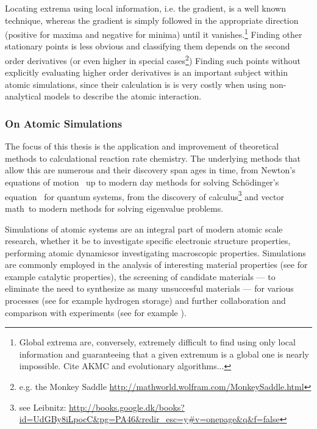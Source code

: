Locating extrema using local information, i.e. the gradient, is a well known technique\citemiss, whereas the gradient is simply followed in the appropriate direction (positive for maxima and negative for minima) until it vanishes.\footnote{Global extrema are, conversely, extremely difficult to find using only local information and guaranteeing that a given extremum is a global one is nearly impossible. Cite AKMC and evolutionary algorithms...}
Finding other stationary points is less obvious and classifying them depends on the second order derivatives (or even higher in special cases\footnote{e.g. the Monkey Saddle \url{http://mathworld.wolfram.com/MonkeySaddle.html}})
Finding such points without explicitly evaluating higher order derivatives is an important subject within atomic simulations, since their calculation is is very costly when using non-analytical  models to describe the atomic interaction.

\subsubsection{On Atomic Simulations}
The focus of this thesis is the application and improvement of theoretical methods to calculational reaction rate chemistry.
The underlying methods that allow this are numerous and their discovery span ages in time, from Newton's equations of motion~\cite{newton-latin} up to modern day methods for solving Sch\"odinger's equation~\cite{schrodinger-equation-1926} for quantum systems\cite{hohenberg-kohn-1964, gpaw-review-2010}, from the discovery of calculus\citemiss\footnote{see Leibnitz: \url{http://books.google.dk/books?id=UdGBy8iLpocC&pg=PA46&redir_esc=y\#v=onepage&q&f=false}} and vector math~\citemiss to modern methods for solving eigenvalue problems\citemiss.

Simulations of atomic systems are an integral part of modern atomic scale research, whether it be to investigate specific electronic structure properties\citemiss, performing atomic dynamics\citemiss or investigating macroscopic properties\citemiss.
Simulations are commonly employed in the analysis of interesting material properties (see for example catalytic properties\citemiss), the screening of candidate materials --- to eliminate the need to synthesize as many unsuccesful materials --- for various processes (see for example hydrogen storage\citemiss) and further collaboration and comparison with experiments (see for example \citemiss).

